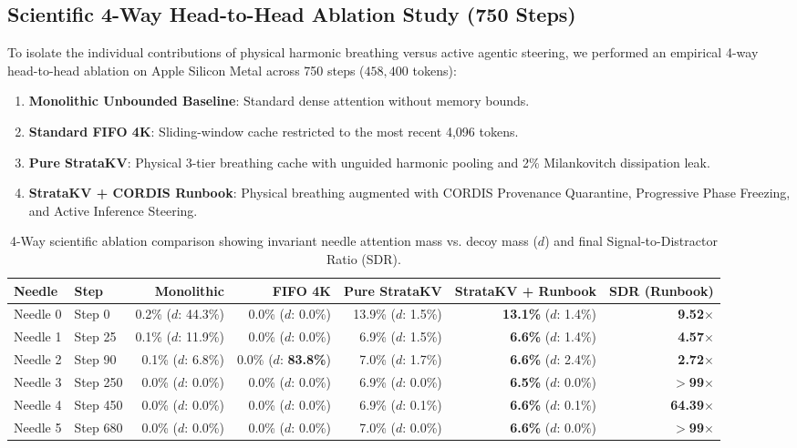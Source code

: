 \subsection{Scientific 4-Way Head-to-Head Ablation Study (750 Steps)}
\label{sec:ablation}

To isolate the individual contributions of physical harmonic breathing versus active agentic steering, we performed an empirical 4-way head-to-head ablation on Apple Silicon Metal across 750 steps ($458,400$ tokens):
\begin{enumerate}
    \item \textbf{Monolithic Unbounded Baseline}: Standard dense attention without memory bounds.
    \item \textbf{Standard FIFO 4K}: Sliding-window cache restricted to the most recent 4,096 tokens.
    \item \textbf{Pure StrataKV}: Physical 3-tier breathing cache with unguided harmonic pooling and 2\% Milankovitch dissipation leak.
    \item \textbf{StrataKV + CORDIS Runbook}: Physical breathing augmented with CORDIS Provenance Quarantine, Progressive Phase Freezing, and Active Inference Steering.
\end{enumerate}

\begin{table}[h]
\centering
\small
\begin{tabular}{@{}llrrrrr@{}}
\toprule
\textbf{Needle} & \textbf{Step} & \textbf{Monolithic} & \textbf{FIFO 4K} & \textbf{Pure StrataKV} & \textbf{StrataKV + Runbook} & \textbf{SDR (Runbook)} \\ \midrule
Needle 0 & Step 0 & 0.2\% ($d$: 44.3\%) & 0.0\% ($d$: 0.0\%) & 13.9\% ($d$: 1.5\%) & \textbf{13.1\%} ($d$: 1.4\%) & \textbf{9.52$\times$} \\
Needle 1 & Step 25 & 0.1\% ($d$: 11.9\%) & 0.0\% ($d$: 0.0\%) & 6.9\% ($d$: 1.5\%) & \textbf{6.6\%} ($d$: 1.4\%) & \textbf{4.57$\times$} \\
Needle 2 & Step 90 & 0.1\% ($d$: 6.8\%) & 0.0\% ($d$: \textbf{83.8\%}) & 7.0\% ($d$: 1.7\%) & \textbf{6.6\%} ($d$: 2.4\%) & \textbf{2.72$\times$} \\
Needle 3 & Step 250 & 0.0\% ($d$: 0.0\%) & 0.0\% ($d$: 0.0\%) & 6.9\% ($d$: 0.0\%) & \textbf{6.5\%} ($d$: 0.0\%) & \textbf{$>$99$\times$} \\
Needle 4 & Step 450 & 0.0\% ($d$: 0.0\%) & 0.0\% ($d$: 0.0\%) & 6.9\% ($d$: 0.1\%) & \textbf{6.6\%} ($d$: 0.1\%) & \textbf{64.39$\times$} \\
Needle 5 & Step 680 & 0.0\% ($d$: 0.0\%) & 0.0\% ($d$: 0.0\%) & 7.0\% ($d$: 0.0\%) & \textbf{6.6\%} ($d$: 0.0\%) & \textbf{$>$99$\times$} \\ \bottomrule
\end{tabular}
\caption{4-Way scientific ablation comparison showing invariant needle attention mass vs. decoy mass ($d$) and final Signal-to-Distractor Ratio (SDR).}
\label{tab:ablation_results}
\end{table}

